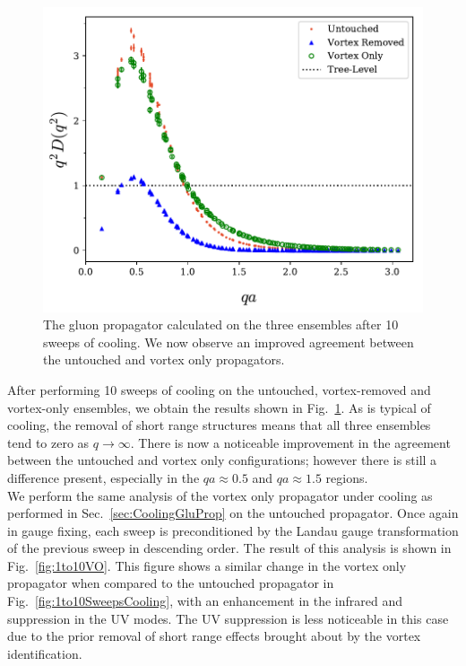 \begin{figure}[tb]
\centering
\includegraphics[width=\linewidth]{./ScalarGluComp_q2_10sweepsAll.pdf}
\caption{\label{fig:10SweepsCooling}The gluon propagator calculated on the three ensembles after 10 sweeps of cooling. We now observe an improved agreement between the untouched and vortex only propagators.}
\end{figure}  
%
After performing 10 sweeps of cooling on the untouched, vortex-removed and vortex-only ensembles, we obtain the results shown in Fig.~\ref{fig:10SweepsCooling}. As is typical of cooling, the removal of short range structures means that all three ensembles tend to zero as $q\rightarrow\infty$. There is now a noticeable improvement in the agreement between the untouched and vortex only configurations; however there is still a difference present, especially in the $qa\approx0.5$ and $qa\approx1.5$ regions.\\

We perform the same analysis of the vortex only propagator under cooling as performed in Sec.~\ref{sec:CoolingGluProp} on the untouched propagator. Once again in gauge fixing, each sweep is preconditioned by the Landau gauge transformation of the previous sweep in descending order. The result of this analysis is shown in Fig.~\ref{fig:1to10VO}. This figure shows a similar change in the vortex only propagator when compared to the untouched propagator in Fig.~\ref{fig:1to10SweepsCooling}, with an enhancement in the infrared and suppression in the UV modes. The UV suppression is less noticeable in this case due to the prior removal of short range effects brought about by the vortex identification.\\

